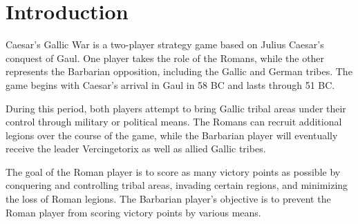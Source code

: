 \section{Introduction}
\par
Caesar's Gallic War is a two-player strategy game based on Julius Caesar's conquest of Gaul. One player takes the role of the Romans, while the other represents the Barbarian opposition, including the Gallic and German tribes. The game begins with Caesar's arrival in Gaul in 58 BC and lasts through 51 BC.
\par
During this period, both players attempt to bring Gallic tribal areas under their control through military or political means. The Romans can recruit additional legions over the course of the game, while the Barbarian player will eventually receive the leader Vercingetorix as well as allied Gallic tribes.
\par
The goal of the Roman player is to score as many victory points as possible by conquering and controlling tribal areas, invading certain regions, and minimizing the loss of Roman legions. The Barbarian player's objective is to prevent the Roman player from scoring victory points by various means.
